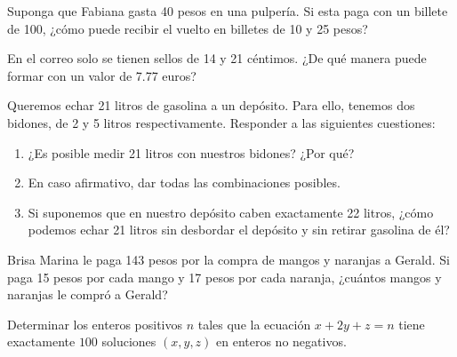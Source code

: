 \begin{problem}
    Suponga que Fabiana gasta 40 pesos en una pulpería.
    Si esta paga con un billete de 100, ¿cómo puede recibir el vuelto en billetes de 10 y 25 pesos?
\end{problem}

\begin{problem}
    En el correo solo se tienen sellos de 14 y 21 céntimos.
    ¿De qué manera puede formar con un valor de 7.77 euros?
\end{problem}

\begin{problem}
    Queremos echar 21 litros de gasolina a un depósito.
    Para ello, tenemos dos bidones, de 2 y 5 litros respectivamente.
    Responder a las siguientes cuestiones:
    \begin{enumerate}
        \item ¿Es posible medir 21 litros con nuestros bidones? ¿Por qué?
        \item En caso afirmativo, dar todas las combinaciones posibles.
        \item Si suponemos que en nuestro depósito caben exactamente 22 litros, ¿cómo podemos echar 21 litros sin desbordar el depósito y sin retirar gasolina de él?
    \end{enumerate}
\end{problem}

\begin{problem}
    Brisa Marina le paga 143 pesos por la compra de mangos y naranjas a Gerald.
    Si paga 15 pesos por cada mango y 17 pesos por cada naranja, ¿cuántos mangos y naranjas le compró a Gerald?
\end{problem}

\begin{problem}
    Determinar los enteros positivos $n$ tales que la ecuación $x + 2y + z = n$ tiene exactamente $100$ soluciones
    $(x,y,z)$ en enteros no negativos.
\end{problem}